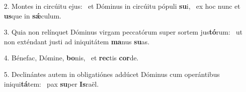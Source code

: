 2. Montes in circúitu ejus: \dag\  et Dóminus in circúitu pópuli \textbf{su}i, \ast\  ex hoc nunc et \textbf{us}que in \textbf{sǽ}culum.\

3. Quia non relínquet Dóminus virgam peccatórum super sortem jus\textbf{tó}rum: \ast\  ut non exténdant justi ad iniquitátem \textbf{ma}nus \textbf{su}as.\

4. Bénefac, Dómine, \textbf{bo}nis, \ast\  et \textbf{rec}tis \textbf{cor}de.\

5. Declinántes autem in obligatiónes addúcet Dóminus cum operántibus iniqui\textbf{tá}tem: \ast\  pax \textbf{su}per \textbf{Is}raël.\

